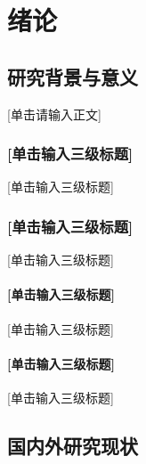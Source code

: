 \chapter{绪论}
\label{sec-3}
{
{
\let\cleardoublepage\relax
}


\section{研究背景与意义} \label{2:introduction}
[单击请输入正文] \citep{wikibook2014latex}

\subsection{[单击输入三级标题]} 
[单击输入三级标题]
\subsection{[单击输入三级标题]} 
[单击输入三级标题]
\subsubsection{[单击输入三级标题]} 
[单击输入三级标题]
\subsubsection{[单击输入三级标题]} 
[单击输入三级标题]

\section{国内外研究现状}


}